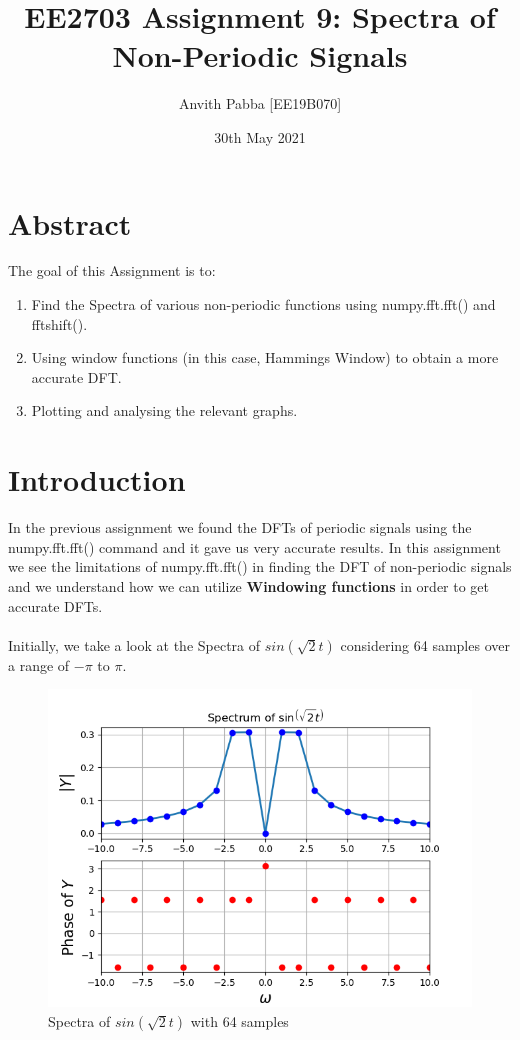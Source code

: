 \documentclass[11pt]{article}
\title{EE2703 Assignment 9: Spectra of Non-Periodic Signals}
\author{Anvith Pabba [EE19B070]}
\date{30th May 2021}
\begin{document}
\maketitle

\section{Abstract}
The goal of this Assignment is to:
\begin{enumerate}
    \item Find the Spectra of various non-periodic functions using numpy.fft.fft() and fftshift().
    \item Using window functions (in this case, Hammings Window) to obtain a more accurate DFT.
    \item Plotting and analysing the relevant graphs.
\end{enumerate}

\section{Introduction}
In the previous assignment we found the DFTs of periodic signals using the numpy.fft.fft() command and it gave us very accurate results. In this assignment we see the limitations of numpy.fft.fft() in finding the DFT of non-periodic signals and we understand how we can utilize \textbf{Windowing functions} in order to get accurate DFTs.\\~\\
Initially, we take a look at the Spectra of $sin(\sqrt{2}t)$ considering 64 samples over a range of $-\pi$ to $\pi$.

\begin{figure}[H]
    \centering
    \includegraphics[scale = 0.75]{Figure_1.png}
    \caption{Spectra of $sin(\sqrt{2}t)$ with 64 samples}
\end{figure}
\end{document}
